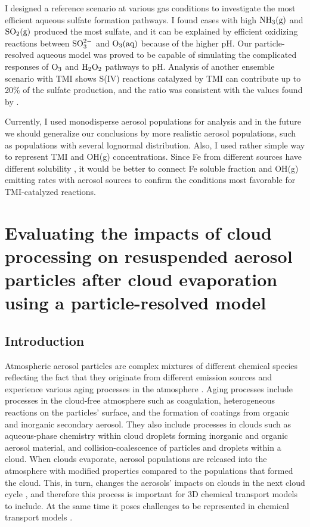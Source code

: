 \documentclass[edeposit,fullpage]{uiucthesis2009}
\begin{document}
I designed a reference scenario at various gas conditions to investigate the most efficient aqueous sulfate formation pathways.
I found cases with high $\rm NH_3(g)$ and $\rm SO_2(g)$ produced the most sulfate, and it can be explained by efficient oxidizing reactions between $\rm SO_3^{2-}$ and $\rm O_3(aq)$ because of the higher pH. Our particle-resolved aqueous model was proved to be capable of simulating the complicated responses of $\rm O_3$ and $\rm H_2O_2$ pathways to pH. Analysis of another ensemble scenario with TMI shows S(IV) reactions catalyzed by TMI can contribute up to 20\% of the sulfate production, and the ratio was consistent with the values found by \citet{alexander2009transition}. 

Currently, I used monodisperse aerosol populations for analysis and in the future we should generalize our conclusions by more realistic aerosol populations, such as populations with several lognormal distribution. Also, I used rather simple way to represent TMI and OH(g) concentrations. Since Fe from different sources have different solubility \citep{desboeufs2005dissolution}, it would be better to connect Fe soluble fraction and OH(g) emitting rates with aerosol sources to confirm the conditions most favorable for TMI-catalyzed reactions. 

\chapter{Evaluating the impacts of cloud processing on resuspended aerosol particles after cloud evaporation using a particle-resolved model}
\label{chap3}
\section{Introduction}
Atmospheric aerosol particles are complex mixtures of different
chemical species reflecting the fact that they originate from
different emission sources and experience various aging processes in
the atmosphere \citep{Riemer2009, Li2011a, Bondy2018, Healy2014,
  Rissler2014}.  Aging processes include processes in the cloud-free
atmosphere such as coagulation, heterogeneous reactions on the
particles' surface, and the formation of coatings from organic and
inorganic secondary aerosol. They also include processes in clouds
\citep{Lance2017} such as aqueous-phase chemistry within cloud droplets
forming inorganic and organic aerosol material, and
collision-coalescence of particles and droplets within a cloud. When
clouds evaporate, aerosol populations are released into the atmosphere
with modified properties compared to the populations that formed the
cloud. This, in turn, changes the aerosols' impacts on clouds in the
next cloud cycle \citep{Hoose2008}, and therefore this process is
important for 3D chemical transport models to include. At the same
time it poses challenges to be represented in chemical transport
models \citep{Gao2016}.
\end{document}
